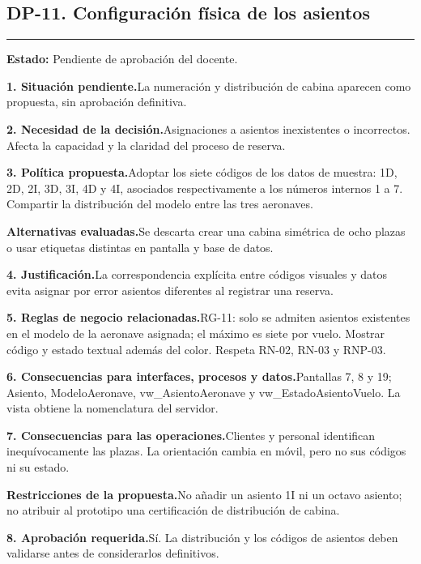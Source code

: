 \documentclass[11pt,a4paper]{article}
\newcommand{\fichacampo}[2]{\noindent\textbf{\color{azulvip}#1}\enspace #2\par\vspace{3pt}}
\begin{document}
\subsection{DP-11. Configuración física de los asientos}
{\color{doradovip}\rule{\textwidth}{.5pt}}
\textbf{Estado:} Pendiente de aprobación del docente.\par\vspace{4pt}
{\normalsize
\fichacampo{1. Situación pendiente.}{La numeración y distribución de cabina aparecen como propuesta, sin aprobación definitiva.}
\fichacampo{2. Necesidad de la decisión.}{Asignaciones a asientos inexistentes o incorrectos. Afecta la capacidad y la claridad del proceso de reserva.}
\fichacampo{3. Política propuesta.}{Adoptar los siete códigos de los datos de muestra: 1D, 2D, 2I, 3D, 3I, 4D y 4I, asociados respectivamente a los números internos 1 a 7. Compartir la distribución del modelo entre las tres aeronaves.}
\fichacampo{Alternativas evaluadas.}{Se descarta crear una cabina simétrica de ocho plazas o usar etiquetas distintas en pantalla y base de datos.}
\fichacampo{4. Justificación.}{La correspondencia explícita entre códigos visuales y datos evita asignar por error asientos diferentes al registrar una reserva.}
\fichacampo{5. Reglas de negocio relacionadas.}{RG-11: solo se admiten asientos existentes en el modelo de la aeronave asignada; el máximo es siete por vuelo. Mostrar código y estado textual además del color. Respeta RN-02, RN-03 y RNP-03.}
\fichacampo{6. Consecuencias para interfaces, procesos y datos.}{Pantallas 7, 8 y 19; Asiento, ModeloAeronave, vw\_AsientoAeronave y vw\_EstadoAsientoVuelo. La vista obtiene la nomenclatura del servidor.}
\fichacampo{7. Consecuencias para las operaciones.}{Clientes y personal identifican inequívocamente las plazas. La orientación cambia en móvil, pero no sus códigos ni su estado.}
\fichacampo{Restricciones de la propuesta.}{No añadir un asiento 1I ni un octavo asiento; no atribuir al prototipo una certificación de distribución de cabina.}
\fichacampo{8. Aprobación requerida.}{Sí. La distribución y los códigos de asientos deben validarse antes de considerarlos definitivos.}
}
\clearpage
\end{document}
